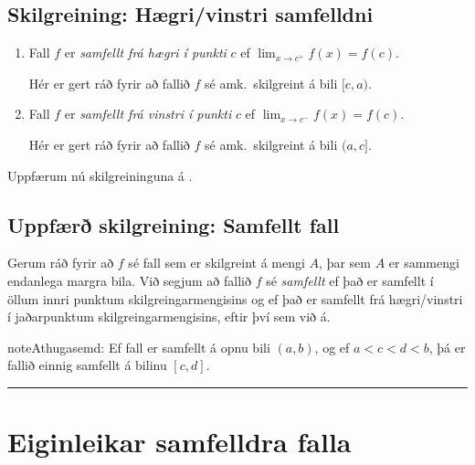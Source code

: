 \documentclass[a4paper,10pt,icelandic]{sphinxmanual}
\begin{document}
\subsection{Skilgreining: Hægri/vinstri samfelldni}
\label{kafli02:skilgreining-haegri-vinstri-samfelldni}\begin{enumerate}
\item {} 
Fall \(f\) er \emph{samfellt frá hægri í punkti} \(c\) ef
\(\lim_{x\rightarrow c^+}f(x)=f(c)\).

Hér er gert ráð fyrir að fallið \(f\) sé amk. skilgreint á
bili \([c, a)\).

\item {} 
Fall \(f\) er \emph{samfellt frá vinstri í punkti} \(c\) ef
\(\lim_{x\rightarrow c^-}f(x)=f(c)\).

Hér er gert ráð fyrir að fallið \(f\) sé amk. skilgreint á
bili \((a, c]\).

\end{enumerate}

Uppfærum nú skilgreininguna á {\hyperref[kafli02:skilgrsamfellt]{}}.


\subsection{Uppfærð skilgreining: Samfellt fall}
\label{kafli02:index-11}\label{kafli02:uppfaer-skilgreining-samfellt-fall}
Gerum ráð fyrir að \(f\) sé fall sem er skilgreint á mengi
\(A\), þar sem \(A\) er sammengi endanlega margra bila. Við
segjum að fallið \(f\) sé \emph{samfellt} ef það er samfellt í öllum
innri punktum skilgreingarmengisins og ef það er samfellt frá
hægri/vinstri í jaðarpunktum skilgreingarmengisins, eftir því sem við á.

\begin{notice}{note}{Athugasemd:}
Ef fall er samfellt á opnu bili \((a,b)\), og ef \(a<c<d<b\), þá
er fallið einnig samfellt á bilinu \([c,d]\).
\end{notice}


\bigskip\hrule{}\bigskip



\section{Eiginleikar samfelldra falla}
\label{kafli02:eiginleikar-samfelldra-falla}
\end{document}
